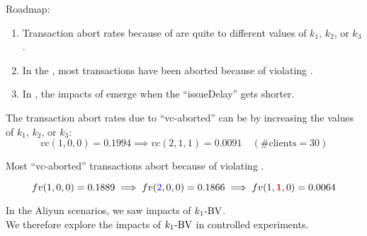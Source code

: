 \begin{frame}{}
  Roadmap:
  \begin{enumerate}[<+->]
    \setlength{\itemsep}{5pt}
    \item Transaction abort rates because of 
      are quite  to different values of $k_1$, $k_2$, or $k_3$.
    \item In the , most transactions have been aborted because of violating \red{$\ktwofv$}.
    \item In , the impacts of \red{$\konebv$} emerge when the ``issueDelay'' gets shorter.
  \end{enumerate}

  \vspace{0.50cm}
\end{frame}

\begin{frame}{}

  \pause
  The transaction abort rates due to ``vc-aborted'' \pause can be 
  by  increasing the values of $k_1$, $k_2$, or $k_3$:
  \[
    vc(1,0,0) = 0.1994 \implies vc(2,1,1) = 0.0091 \quad (\text{\#clients} = 30)
  \]
\end{frame}

\begin{frame}{}

  \pause
  \centerline{Most ``vc-aborted'' transactions abort because of violating \red{$\ktwofv$}.}
  \[
    fv(1,0,0) = 0.1889 \implies fv(\textcolor{blue}{2},0,0) = 0.1866 \implies fv(1,\textcolor{red}{\bf 1},0) = 0.0064
  \]
\end{frame}

\begin{frame}{}
  \begin{center}
    In the Aliyun scenarios, we saw  impacts of $\konebv$. \\[30pt]

    \pause
    We therefore explore the impacts of $\konebv$ in controlled experiments.
  \end{center}
\end{frame}

